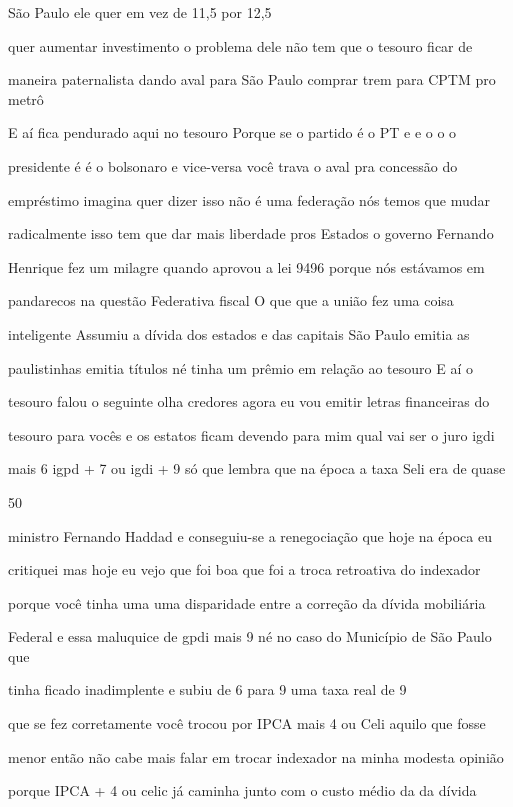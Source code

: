 \documentclass[a4paper,12pt]{article}
\begin{document}
São Paulo ele quer em vez de 11,5 por 12,5%

quer aumentar investimento o problema dele não tem que o tesouro ficar de

maneira paternalista dando aval para São Paulo comprar trem para CPTM pro metrô

E aí fica pendurado aqui no tesouro Porque se o partido é o PT e e o o o

presidente é é o bolsonaro e vice-versa você trava o aval pra concessão do

empréstimo imagina quer dizer isso não é uma federação nós temos que mudar

radicalmente isso tem que dar mais liberdade pros Estados o governo Fernando

Henrique fez um milagre quando aprovou a lei 9496 porque nós estávamos em

pandarecos na questão Federativa fiscal O que que a união fez uma coisa

inteligente Assumiu a dívida dos estados e das capitais São Paulo emitia as

paulistinhas emitia títulos né tinha um prêmio em relação ao tesouro E aí o

tesouro falou o seguinte olha credores agora eu vou emitir letras financeiras do

tesouro para vocês e os estatos ficam devendo para mim qual vai ser o juro igdi

mais 6 igpd + 7 ou igdi + 9 só que lembra que na época a taxa Seli era de quase

50%

ministro Fernando Haddad e conseguiu-se a renegociação que hoje na época eu

critiquei mas hoje eu vejo que foi boa que foi a troca retroativa do indexador

porque você tinha uma uma disparidade entre a correção da dívida mobiliária

Federal e essa maluquice de gpdi mais 9 né no caso do Município de São Paulo que

tinha ficado inadimplente e subiu de 6 para 9 uma taxa real de 9%

que se fez corretamente você trocou por IPCA mais 4 ou Celi aquilo que fosse

menor então não cabe mais falar em trocar indexador na minha modesta opinião

porque IPCA + 4 ou celic já caminha junto com o custo médio da da dívida
\end{document}
